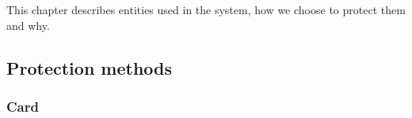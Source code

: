 \chapter{}

This chapter describes entities used in the system, how we choose to protect them and why.

\newpage

\section{Protection methods}

\subsection{Card}


